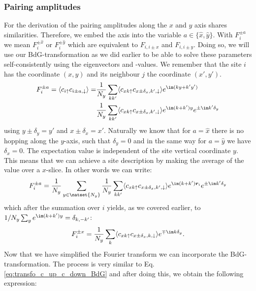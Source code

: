 \documentclass[../main.tex]{subfile}
\begin{document}
\subsubsection{Pairing amplitudes}
For the derivation of the pairing amplitudes along the $x$ and $y$ axis shares similarities. Therefore, we embed the axis into the variable $a\in\{\hat{x},\hat{y}\}$.
With $F_i^{\pm a}$ we mean $F_i^{\pm \hat{x}}$ or $F_i^{\pm \hat{y}}$ which are equivalent to $F_{i,i\pm x}$ and $F_{i,i\pm y}$.
Doing so, we will use our BdG-transformation as we did earlier to be 
able to solve these parameters self-consistently using the eigenvectors and -values. We remember that the site $i$ has the coordinate $(x,y)$ and its neighbour $j$
the coordinate $(x',y')$.
\begin{align*}
    F_i^{\pm a} = \langle c_{i\uparrow} c_{i\pm a,\downarrow}\rangle =& \frac{1}{N_y} \sum_{kk'} \langle c_{x k\uparrow} c_{x\pm \delta_x,k',\downarrow} \rangle e^{\im(ky + k'y')}\\
                                                                    &   \frac{1}{N_y} \sum_{kk'} \langle c_{x k\uparrow} c_{x\pm \delta_x,k',\downarrow} \rangle e^{\im(k + k')y} e^{\pm\im k' \delta_y}
\end{align*}
using $y\pm \delta_y = y'$ and $x\pm \delta_x = x'$. Naturally we know that for $a = \hat{x}$ there is no hopping along the $y$-axis, such that $\delta_y=0$ and in the same way for $a = \hat{y}$ we have $\delta_x = 0$.
The expectation value is independent of the site vertical coordinate $y$. This means that we can achieve a site description 
by making the average of the value over a $x$-slice. In other words
we can write:
\begin{equation*}
    F^{\pm a}_i = 
    \frac{1}{N_y}\sum_{y\in\natset{N_y}} \frac{1}{N_y} \sum_{kk'} \langle c_{x k\uparrow} c_{x \pm \delta_x,k',\downarrow} \rangle e^{\im(k + k')\bm{r}_i} e^{\pm\im k'\delta_y}
\end{equation*}
which after the summation over $i$ yields, as we covered earlier, to $1/N_y \sum_{y} e^{\im(k + k')y} = \delta_{k,-k'}$:
\begin{equation*}
    F^{\pm x}_i = 
    \frac{1}{N_y} \sum_{k} \langle c_{x k\uparrow} c_{x\pm \delta_x,k,\downarrow} \rangle e^{\mp\im k\delta_y}.
\end{equation*}
Now that we have simplified the Fourier transform we can incorporate the BdG-transformation. The process is very similar to Eq. \ref{eq:transfo_c_up_c_down_BdG} and after doing this,
we obtain the following expression:
\end{document}
